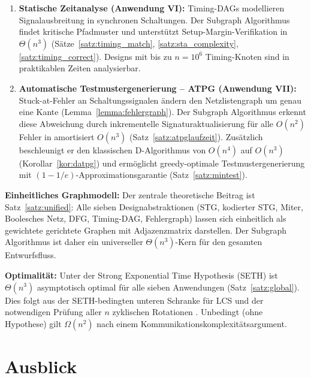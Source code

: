 ﻿\documentclass[a4paper,12pt]{article}
\theoremstyle{definition}
\begin{document}
\begin{enumerate}
  \item \textbf{Statische Zeitanalyse (Anwendung VI):} Timing-DAGs modellieren
        Signalausbreitung in synchronen Schaltungen. Der Subgraph Algorithmus findet
        kritische Pfadmuster und unterstützt Setup-Margin-Verifikation in $\Theta(n^3)$
        (Sätze~\ref{satz:timing_match}, \ref{satz:sta_complexity},
        \ref{satz:timing_correct}). Designs mit bis zu $n = 10^6$ Timing-Knoten sind
        in praktikablen Zeiten analysierbar.

  \item \textbf{Automatische Testmustergenerierung -- ATPG (Anwendung VII):}
        Stuck-at-Fehler an Schaltungssignalen ändern den Netzlistengraph um genau
        eine Kante (Lemma~\ref{lemma:fehlergraph}). Der Subgraph Algorithmus erkennt
        diese Abweichung durch inkrementelle Signaturaktualisierung für alle
        $O(n^2)$ Fehler in amortisiert $O(n^3)$ (Satz~\ref{satz:atpglaufzeit}).
        Zusätzlich beschleunigt er den klassischen D-Algorithmus von $O(n^4)$ auf
        $O(n^3)$ (Korollar~\ref{kor:datpg}) und ermöglicht greedy-optimale
        Testmustergenerierung mit $(1-1/e)$-Approximationsgarantie
        (Satz~\ref{satz:mintest}).
\end{enumerate}

\textbf{Einheitliches Graphmodell:} Der zentrale theoretische Beitrag ist
Satz~\ref{satz:unified}: Alle sieben Designabstraktionen (STG, kodierter STG,
Miter, Boolesches Netz, DFG, Timing-DAG, Fehlergraph) lassen sich einheitlich als
gewichtete gerichtete Graphen mit Adjazenzmatrix darstellen. Der Subgraph Algorithmus
ist daher ein universeller $\Theta(n^3)$-Kern für den gesamten Entwurfsfluss.

\textbf{Optimalität:} Unter der Strong Exponential Time Hypothesis (SETH) ist
$\Theta(n^3)$ asymptotisch optimal für alle sieben Anwendungen (Satz~\ref{satz:global}).
Dies folgt aus der SETH-bedingten unteren Schranke für LCS \cite{abboud2015tight}
und der notwendigen Prüfung aller $n$ zyklischen Rotationen \cite{subgraph2026}.
Unbedingt (ohne Hypothese) gilt $\Omega(n^2)$ nach einem Kommunikationskomplexitätsargument.

\section{Ausblick}
\label{sec:ausblick}
\end{document}
